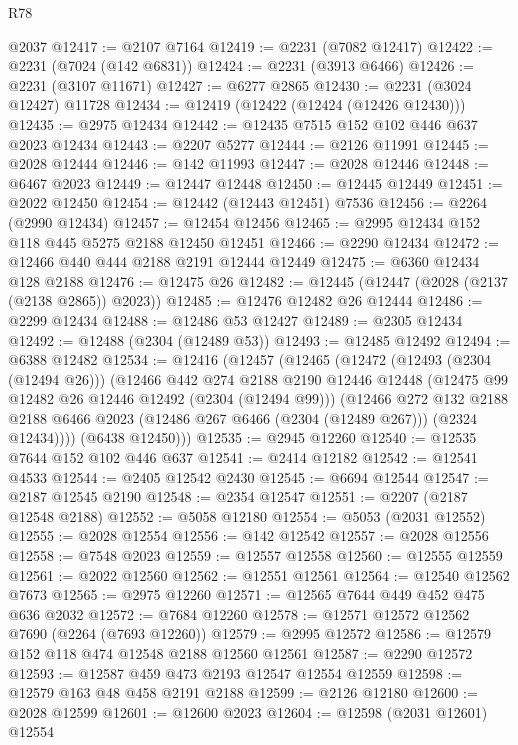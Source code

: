 \begin{lexlean}{R78}
\begin{coremodule}
    @2037
@12417 := @2107 @7164
@12419 := @2231 (@7082 @12417)
@12422 := @2231 (@7024 (@142 @6831))
@12424 := @2231 (@3913 @6466)
@12426 := @2231 (@3107 @11671)
@12427 := @6277 @2865
@12430 := @2231 (@3024 @12427) @11728
@12434 := @12419 (@12422 (@12424 (@12426 @12430)))
@12435 := @2975 @12434
@12442 := @12435 @7515 @152 @102 @446 @637 @2023 @12434
@12443 := @2207 @5277
@12444 := @2126 @11991
@12445 := @2028 @12444
@12446 := @142 @11993
@12447 := @2028 @12446
@12448 := @6467 @2023
@12449 := @12447 @12448
@12450 := @12445 @12449
@12451 := @2022 @12450
@12454 := @12442 (@12443 @12451) @7536
@12456 := @2264 (@2990 @12434)
@12457 := @12454 @12456
@12465 := @2995 @12434 @152 @118 @445 @5275 @2188 @12450 @12451
@12466 := @2290 @12434
@12472 := @12466 @440 @444 @2188 @2191 @12444 @12449
@12475 := @6360 @12434 @128 @2188
@12476 := @12475 @26
@12482 := @12445 (@12447 (@2028 (@2137 (@2138 @2865)) @2023))
@12485 := @12476 @12482 @26 @12444
@12486 := @2299 @12434
@12488 := @12486 @53 @12427
@12489 := @2305 @12434
@12492 := @12488 (@2304 (@12489 @53))
@12493 := @12485 @12492
@12494 := @6388 @12482
@12534 := @12416
    (@12457
      (@12465
        (@12472
          (@12493 (@2304 (@12494 @26)))
          (@12466
            @442
            @274
            @2188
            @2190
            @12446
            @12448
            (@12475 @99 @12482 @26 @12446 @12492 (@2304 (@12494 @99)))
            (@12466
              @272
              @132
              @2188
              @2188
              @6466
              @2023
              (@12486 @267 @6466 (@2304 (@12489 @267)))
              (@2324 @12434))))
        (@6438 @12450)))
@12535 := @2945 @12260
@12540 := @12535 @7644 @152 @102 @446 @637
@12541 := @2414 @12182
@12542 := @12541 @4533
@12544 := @2405 @12542 @2430
@12545 := @6694 @12544
@12547 := @2187 @12545 @2190
@12548 := @2354 @12547
@12551 := @2207 (@2187 @12548 @2188)
@12552 := @5058 @12180
@12554 := @5053 (@2031 @12552)
@12555 := @2028 @12554
@12556 := @142 @12542
@12557 := @2028 @12556
@12558 := @7548 @2023
@12559 := @12557 @12558
@12560 := @12555 @12559
@12561 := @2022 @12560
@12562 := @12551 @12561
@12564 := @12540 @12562 @7673
@12565 := @2975 @12260
@12571 := @12565 @7644 @449 @452 @475 @636 @2032
@12572 := @7684 @12260
@12578 := @12571 @12572 @12562 @7690 (@2264 (@7693 @12260))
@12579 := @2995 @12572
@12586 := @12579 @152 @118 @474 @12548 @2188 @12560 @12561
@12587 := @2290 @12572
@12593 := @12587 @459 @473 @2193 @12547 @12554 @12559
@12598 := @12579 @163 @48 @458 @2191 @2188
@12599 := @2126 @12180
@12600 := @2028 @12599
@12601 := @12600 @2023
@12604 := @12598 (@2031 @12601) @12554

\end{coremodule}
\end{lexlean}
